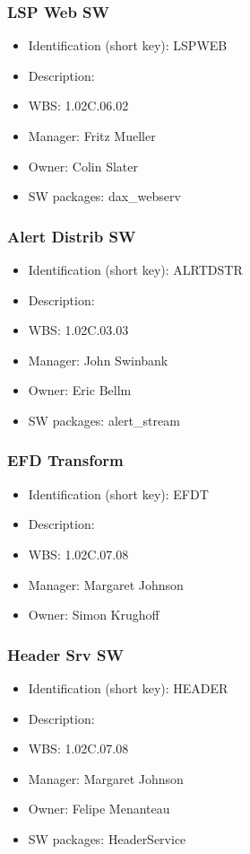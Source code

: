 \subsubsection{LSP Web SW}\label{sect:LSPWEB}
\begin{itemize}
\item Identification (short key): LSPWEB
\item Description: 
\item WBS: 1.02C.06.02
\item Manager: Fritz Mueller
\item Owner: Colin Slater
\item SW packages: dax\_webserv
\end{itemize}

\subsubsection{Alert Distrib SW}\label{sect:ALRTDSTR}
\begin{itemize}
\item Identification (short key): ALRTDSTR
\item Description: 
\item WBS: 1.02C.03.03
\item Manager: John Swinbank
\item Owner: Eric Bellm
\item SW packages: alert\_stream
\end{itemize}

\subsubsection{EFD Transform}\label{sect:EFDT}
\begin{itemize}
\item Identification (short key): EFDT
\item Description: 
\item WBS: 1.02C.07.08
\item Manager: Margaret Johnson
\item Owner: Simon Krughoff
\end{itemize}

\subsubsection{Header Srv SW}\label{sect:HEADER}
\begin{itemize}
\item Identification (short key): HEADER
\item Description: 
\item WBS: 1.02C.07.08
\item Manager: Margaret Johnson
\item Owner: Felipe Menanteau
\item SW packages: HeaderService
\end{itemize}

